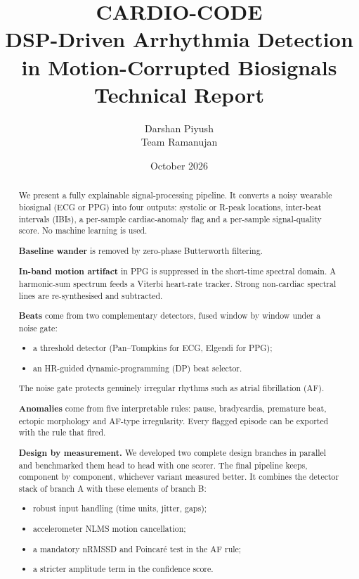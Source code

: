 \documentclass[10pt,a4paper]{article}
\title{\textbf{CARDIO-CODE}\\[2pt]
\large DSP-Driven Arrhythmia Detection in Motion-Corrupted Biosignals\\[2pt]
\normalsize Technical Report}
\author{Darshan \qquad Piyush\\[4pt]\normalsize Team Ramanujan}
\date{October 2026}
\begin{document}
\maketitle
\thispagestyle{fancy}

\begin{abstract}\setlength{\parindent}{0pt}\setlength{\parskip}{4pt}
\noindent
We present a fully explainable signal-processing pipeline. It converts a noisy wearable biosignal (ECG or PPG) into
four outputs: systolic or R-peak locations, inter-beat intervals (IBIs), a per-sample cardiac-anomaly flag and a
per-sample signal-quality score. No machine learning is used.

\textbf{Baseline wander} is removed by zero-phase Butterworth filtering.

\textbf{In-band motion artifact} in PPG is suppressed in the short-time spectral domain. A harmonic-sum spectrum feeds a
Viterbi heart-rate tracker. Strong non-cardiac spectral lines are re-synthesised and subtracted.

\textbf{Beats} come from two complementary detectors, fused window by window under a noise gate:
\begin{itemize}
  \item a threshold detector (Pan--Tompkins for ECG, Elgendi for PPG);
  \item an HR-guided dynamic-programming (DP) beat selector.
\end{itemize}
The noise gate protects genuinely irregular rhythms such as atrial fibrillation (AF).

\textbf{Anomalies} come from five interpretable rules: pause, bradycardia, premature beat, ectopic morphology and AF-type
irregularity. Every flagged episode can be exported with the rule that fired.

\textbf{Design by measurement.} We developed two complete design branches in parallel and benchmarked them
head to head with one scorer. The final pipeline keeps, component by component, whichever variant measured better.
It combines the detector stack of branch A with these elements of branch B:
\begin{itemize}
  \item robust input handling (time units, jitter, gaps);
  \item accelerometer NLMS motion cancellation;
  \item a mandatory nRMSSD and Poincar\'e test in the AF rule;
  \item a stricter amplitude term in the confidence score.
\end{itemize}


\end{abstract}
\end{document}
